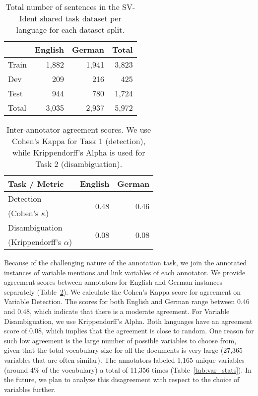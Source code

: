 \documentclass[11pt]{article}
\begin{document}
\begin{table}[]
    \centering
    \begin{tabular}{l|r|r|r}
         & English & German & Total \\
        \hline
        \hline
        Train & 1,882 & 1,941 & 3,823\\
        Dev & 209 & 216 & 425\\
        Test & 944 & 780 & 1,724\\
        \hline
        Total & 3,035 & 2,937 & 5,972 \\
        \hline
    \end{tabular}
    \caption{Total number of sentences in the SV-Ident shared task dataset per language for each dataset split.}
    \label{tab:data_stats}
\end{table}


\begin{table}[]
    \centering
    \begin{tabular}{p{3cm}|r|r}
        Task / Metric & English & German \\
        \hline
        \hline
        Detection & \multirow{ 2}{*}{0.48} & \multirow{ 2}{*}{0.46} \\
        (Cohen's $\kappa$) &&\\
        \hline
        Disambiguation  & \multirow{ 2}{*}{0.08} & \multirow{ 2}{*}{0.08}\\
        (Krippendorff’s $\alpha$) &&\\
        \hline
    \end{tabular}
    \caption{Inter-annotator agreement scores. We use Cohen's Kappa for Task 1 (detection), while Krippendorff's Alpha is used for Task 2 (disambiguation).}
    \label{tab:ann_aggrement}
\end{table}

Because of the challenging nature of the annotation task, we join the annotated instances of variable mentions and link variables of each annotator.
We provide agreement scores between annotators for English and German instances separately (Table~\ref{tab:ann_aggrement}).
We calculate the Cohen's Kappa score for agreement on Variable Detection.
The scores for both English and German range between 0.46 and 0.48, which indicate that there is a moderate agreement.
For Variable Disambiguation, we use Krippendorff's Alpha.
Both languages have an agreement score of 0.08, which implies that the agreement is close to random.
One reason for such low agreement is the large number of possible variables to choose from, given that the total vocabulary size for all the documents is very large (27,365 variables that are often similar).
The annotators labeled 1,165 unique variables (around 4\% of the vocabulary) a total of 11,356 times (Table~\ref{tab:var_stats}).
In the future, we plan to analyze this disagreement with respect to the choice of variables further.
\end{document}
